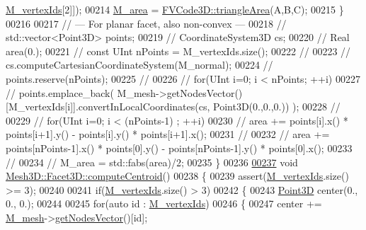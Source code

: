\begin{DoxyCode}
      \hyperlink{classFVCode3D_1_1Mesh3D_1_1Facet3D_ae763d815d2b4406b2f09d0ee5133392c}{M\_vertexIds}[2]]);
00214         \hyperlink{classFVCode3D_1_1Mesh3D_1_1Facet3D_a464195f44615c5dcba666c6ec3fde430}{M\_area} = \hyperlink{namespaceFVCode3D_a38b320ef9683fae74a67a2a5a921f0d9}{FVCode3D::triangleArea}(A,B,C);
00215     \}
00216 
00217     \textcolor{comment}{// --- For planar facet, also non-convex ---}
00218 \textcolor{comment}{//    std::vector<Point3D> points;}
00219 \textcolor{comment}{//    CoordinateSystem3D cs;}
00220 \textcolor{comment}{//    Real area(0.);}
00221 \textcolor{comment}{//    const UInt nPoints = M\_vertexIds.size();}
00222 \textcolor{comment}{//}
00223 \textcolor{comment}{//    cs.computeCartesianCoordinateSystem(M\_normal);}
00224 \textcolor{comment}{//    points.reserve(nPoints);}
00225 \textcolor{comment}{//}
00226 \textcolor{comment}{//    for(UInt i=0; i < nPoints; ++i)}
00227 \textcolor{comment}{//        points.emplace\_back( M\_mesh->getNodesVector()[M\_vertexIds[i]].convertInLocalCoordinates(cs,
       Point3D(0.,0.,0.)) );}
00228 \textcolor{comment}{//}
00229 \textcolor{comment}{//    for(UInt i=0; i < (nPoints-1) ; ++i)}
00230 \textcolor{comment}{//        area += points[i].x() * points[i+1].y() - points[i].y() * points[i+1].x();}
00231 \textcolor{comment}{//}
00232 \textcolor{comment}{//    area += points[nPoints-1].x() * points[0].y() - points[nPoints-1].y() * points[0].x();}
00233 \textcolor{comment}{//}
00234 \textcolor{comment}{//    M\_area = std::fabs(area)/2;}
00235 \}
00236 
\hypertarget{Mesh3D_8cpp_source.tex_l00237}{}\hyperlink{classFVCode3D_1_1Mesh3D_1_1Facet3D_a67899ed8ad959cf2788f011b9e87dc15}{00237} \textcolor{keywordtype}{void} \hyperlink{classFVCode3D_1_1Mesh3D_1_1Facet3D_a67899ed8ad959cf2788f011b9e87dc15}{Mesh3D::Facet3D::computeCentroid}()
00238 \{
00239     assert(\hyperlink{classFVCode3D_1_1Mesh3D_1_1Facet3D_ae763d815d2b4406b2f09d0ee5133392c}{M\_vertexIds}.size() >= 3);
00240 
00241     \textcolor{keywordflow}{if}(\hyperlink{classFVCode3D_1_1Mesh3D_1_1Facet3D_ae763d815d2b4406b2f09d0ee5133392c}{M\_vertexIds}.size() > 3)
00242     \{
00243         \hyperlink{classFVCode3D_1_1Point3D}{Point3D} center(0., 0., 0.);
00244 
00245         \textcolor{keywordflow}{for}(\textcolor{keyword}{auto} \textcolor{keywordtype}{id} : \hyperlink{classFVCode3D_1_1Mesh3D_1_1Facet3D_ae763d815d2b4406b2f09d0ee5133392c}{M\_vertexIds})
00246         \{
00247             center += \hyperlink{classFVCode3D_1_1Mesh3D_1_1Facet3D_adf8cf45ade4804389de18428aea4969d}{M\_mesh}->\hyperlink{classFVCode3D_1_1Mesh3D_a04162ec60e0fe52674b3ecbb7de1185c}{getNodesVector}()[id];

\end{DoxyCode}
